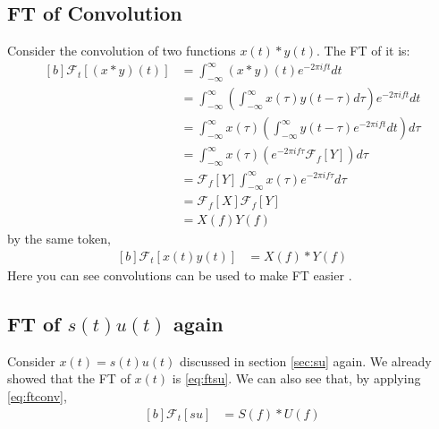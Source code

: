 \documentclass[letterpaper, 11pt]{article}
\newcommand{\fint}{\int_{-\infty}^{\infty}} %
\newcommand{\fourier}[2]{\mathcal{F}_{#1}[#2]} %
\newcommand{\ft}[3]{\fint #2 e^{-2\pi i#3#1} d#1} %
\newcommand{\conv}[4]{\fint #3(#2)#4(#1 - #2) d#2} %
\numberwithin{equation}{section}
\numberwithin{figure}{section}
\numberwithin{table}{section}
\begin{document}
\subsection{FT of Convolution}
Consider the convolution of two functions \(x(t)*y(t)\). The FT of it is:
\begin{equation}
	\begin{aligned}[b]
		\fourier{t}{(x*y)(t)}
			&= \ft{t}{(x*y)(t)}{f}\\
			&= \ft{t}{\left (\conv{t}{\tau}{x}{y} \right )}{f}\\ 
			&= \fint x(\tau) \left (\fint y(t - \tau) e^{-2\pi ift} dt \right ) d\tau\\
			&= \fint x(\tau) \left ( e^{-2\pi if\tau}\fourier{f}{Y} \right )d\tau\\ 
			&= \fourier{f}{Y} \ft{\tau}{x(\tau)}{f}\\
			&= \fourier{f}{X} \fourier{f}{Y}\\
			&= X(f)Y(f)
	\end{aligned}
\end{equation}
by the same token,
\begin{equation}
	\begin{aligned}[b]
		\fourier{t}{x(t)y(t)}
			&= X(f)*Y(f)
			\label{eq:ftconv}
	\end{aligned}
\end{equation}
Here you can see convolutions can be used to make FT easier \cite{james}.

\subsection{FT of \(s(t)u(t)\) again}
Consider \(x(t) = s(t)u(t)\) discussed in section \ref{sec:su} again. We already showed that the FT of \(x(t)\) is \eqref{eq:ftsu}. We can also see that, by applying \eqref{eq:ftconv}, 
\begin{equation}
	\begin{aligned}[b]
		\fourier{t}{su}
		&= S(f)*U(f)
	\end{aligned}
\end{equation}

\clearpage
\pagestyle{plain}
\printbibliography
{}
\printindex
\end{document}
